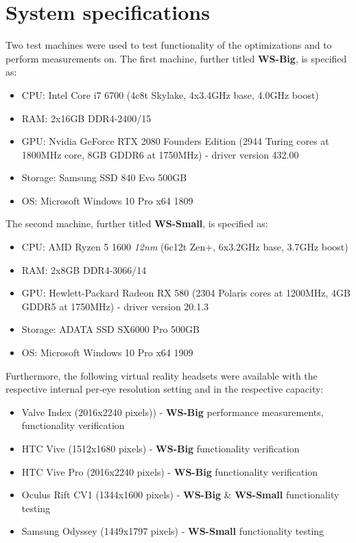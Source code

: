 \section{System specifications}
Two test machines were used to test functionality of the optimizations and to perform measurements on. 
The first machine, further titled \textbf{WS-Big}, is specified as:
\begin{itemize}
\item CPU: Intel Core i7 6700 (4c8t Skylake, 4x3.4GHz base, 4.0GHz boost)
\item RAM: 2x16GB DDR4-2400/15
\item GPU: Nvidia GeForce RTX 2080 Founders Edition (2944 Turing cores at 1800MHz core, 8GB GDDR6 at 1750MHz) - driver version 432.00
\item Storage: Samsung SSD 840 Evo 500GB
\item OS: Microsoft Windows 10 Pro x64 1809
\end{itemize} 
The second machine, further titled \textbf{WS-Small}, is specified as:
\begin{itemize}
\item CPU: AMD Ryzen 5 1600 \textit{12nm} (6c12t Zen+, 6x3.2GHz base, 3.7GHz boost)
\item RAM: 2x8GB DDR4-3066/14
\item GPU: Hewlett-Packard Radeon RX 580 (2304 Polaris cores at 1200MHz, 4GB GDDR5 at 1750MHz) - driver version 20.1.3
\item Storage: ADATA SSD SX6000 Pro 500GB
\item OS: Microsoft Windows 10 Pro x64 1909
\end{itemize} 
Furthermore, the following virtual reality headsets were available with the respective internal per-eye resolution setting and in the respective capacity:
\begin{itemize}
\item Valve Index (2016x2240 pixels)) - \textbf{WS-Big} performance measurements, functionality verification
\item HTC Vive (1512x1680 pixels) - \textbf{WS-Big} functionality verification
\item HTC Vive Pro (2016x2240 pixels) - \textbf{WS-Big} functionality verification
\item Oculus Rift CV1 (1344x1600 pixels) - \textbf{WS-Big} \& \textbf{WS-Small} functionality testing
\item Samsung Odyssey (1449x1797 pixels) - \textbf{WS-Small} functionality testing
\end{itemize} 
